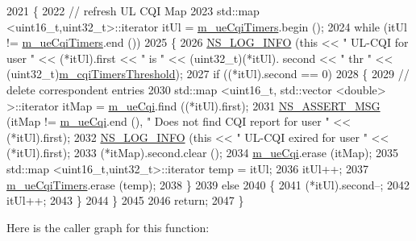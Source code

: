 \begin{DoxyCode}
2021 \{
2022   \textcolor{comment}{// refresh UL CQI  Map}
2023   std::map <uint16\_t,uint32\_t>::iterator itUl = \hyperlink{classns3_1_1FdMtFfMacScheduler_a673838e77ceb0404b1379674e14802e1}{m\_ueCqiTimers}.begin ();
2024   \textcolor{keywordflow}{while} (itUl != \hyperlink{classns3_1_1FdMtFfMacScheduler_a673838e77ceb0404b1379674e14802e1}{m\_ueCqiTimers}.end ())
2025     \{
2026       \hyperlink{group__logging_gafbd73ee2cf9f26b319f49086d8e860fb}{NS\_LOG\_INFO} (\textcolor{keyword}{this} << \textcolor{stringliteral}{" UL-CQI for user "} << (*itUl).first << \textcolor{stringliteral}{" is "} << (uint32\_t)(*itUl).
      second << \textcolor{stringliteral}{" thr "} << (uint32\_t)\hyperlink{classns3_1_1FdMtFfMacScheduler_a2594d67e25a125c89b90a5eba5e46cc9}{m\_cqiTimersThreshold});
2027       \textcolor{keywordflow}{if} ((*itUl).second == 0)
2028         \{
2029           \textcolor{comment}{// delete correspondent entries}
2030           std::map <uint16\_t, std::vector <double> >::iterator itMap = \hyperlink{classns3_1_1FdMtFfMacScheduler_a5111c284868ab2a71c868fff681dbc0b}{m\_ueCqi}.find ((*itUl).first);
2031           \hyperlink{assert_8h_aff5ece9066c74e681e74999856f08539}{NS\_ASSERT\_MSG} (itMap != \hyperlink{classns3_1_1FdMtFfMacScheduler_a5111c284868ab2a71c868fff681dbc0b}{m\_ueCqi}.end (), \textcolor{stringliteral}{" Does not find CQI report for user "}
       << (*itUl).first);
2032           \hyperlink{group__logging_gafbd73ee2cf9f26b319f49086d8e860fb}{NS\_LOG\_INFO} (\textcolor{keyword}{this} << \textcolor{stringliteral}{" UL-CQI exired for user "} << (*itUl).first);
2033           (*itMap).second.clear ();
2034           \hyperlink{classns3_1_1FdMtFfMacScheduler_a5111c284868ab2a71c868fff681dbc0b}{m\_ueCqi}.erase (itMap);
2035           std::map <uint16\_t,uint32\_t>::iterator temp = itUl;
2036           itUl++;
2037           \hyperlink{classns3_1_1FdMtFfMacScheduler_a673838e77ceb0404b1379674e14802e1}{m\_ueCqiTimers}.erase (temp);
2038         \}
2039       \textcolor{keywordflow}{else}
2040         \{
2041           (*itUl).second--;
2042           itUl++;
2043         \}
2044     \}
2045 
2046   \textcolor{keywordflow}{return};
2047 \}
\end{DoxyCode}


Here is the caller graph for this function\+:


